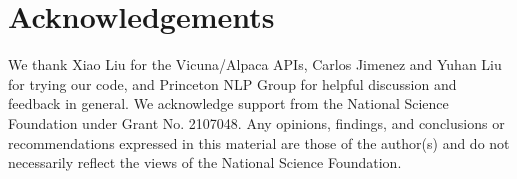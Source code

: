 \section*{Acknowledgements}
We thank Xiao Liu for the Vicuna/Alpaca APIs, Carlos Jimenez and Yuhan Liu for trying our code, and Princeton NLP Group for helpful discussion and feedback in general. We acknowledge support from the National Science Foundation under Grant No. 2107048. Any opinions, findings, and conclusions or recommendations expressed in this material are those of the author(s) and do not necessarily reflect the views of the National Science Foundation.
\label{sec:acknowledgements}